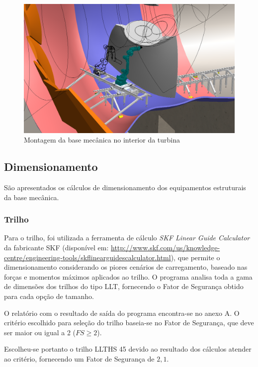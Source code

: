 \begin{figure}[H]
	\centering
	\includegraphics[width=0.9\columnwidth]{figs/construcao/EMMA_Base_Secundaria_01}
	\caption{Montagem da base mecânica no interior da turbina}
    \label{fig::EMMA_Base_Secundaria_01}
\end{figure}

\subsection{Dimensionamento}

São apresentados os cálculos de dimensionamento dos equipamentos estruturais
da base mecânica.

\subsubsection{Trilho}

Para o trilho, foi utilizada a ferramenta de cálculo
\textit{SKF Linear Guide Calculator} da fabricante SKF (disponível em:
\url{http://www.skf.com/us/knowledge-centre/engineering-tools/skflinearguidescalculator.html}),
que permite o dimensionamento considerando os piores cenários de carregamento,
baseado nas forças e momentos máximos aplicados ao trilho.
O programa analisa toda a gama de dimensões dos trilhos do tipo LLT, fornecendo
o Fator de Segurança obtido para cada opção de tamanho.

O relatório com o resultado de saída do programa encontra-se no anexo A.
O critério escolhido para seleção do trilho baseia-se no Fator de Segurança, que
deve ser maior ou igual a 2 ($FS\geq2$). 

Escolheu-se portanto o trilho LLTHS 45 devido ao resultado dos cálculos
atender ao critério, fornecendo um Fator de Segurança de $2,1$.

